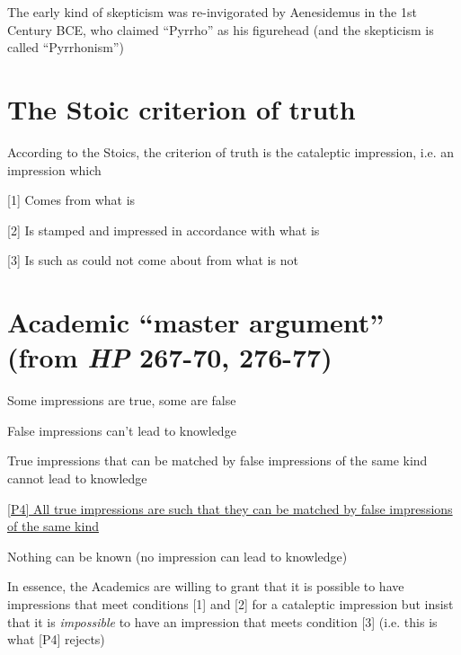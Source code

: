 \documentclass[11pt]{article}
\begin{document}
\noindent The early kind of skepticism was re-invigorated by Aenesidemus in the 1st Century BCE, who claimed ``Pyrrho'' as his figurehead (and the skepticism is called ``Pyrrhonism'')
\vspace*{-2mm}

\section*{The Stoic criterion of truth}

\noindent According to the Stoics, the criterion of truth is the cataleptic impression, i.e. an impression which
\vspace*{2mm}

[1] Comes from what is
\vspace*{1mm}

[2] Is stamped and impressed in accordance with what is
\vspace*{1mm}

[3] Is such as could not come about from what is not
\vspace*{-2mm}

\section*{Academic ``master argument'' (from \emph{HP} 267-70, 276-77)}

\noindent [P1] Some impressions are true, some are false
\vspace*{1mm}

\noindent [P2] False impressions can't lead to knowledge
\vspace*{1mm}

\noindent [P3] True impressions that can be matched by false impressions of the same kind cannot lead to knowledge
\vspace*{1mm}

\noindent\underline{[P4] All true impressions are such that they can be matched by false impressions of the same kind}
\vspace*{1mm}

\noindent [C] Nothing can be known (no impression can lead to knowledge)
\vspace*{2mm}

\noindent In essence, the Academics are willing to grant that it is possible to have impressions that meet conditions [1] and [2] for a cataleptic impression but insist that it is \emph{impossible} to have an impression that meets condition [3] (i.e. this is what [P4] rejects)
\vspace*{2mm}
\end{document}
